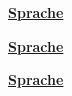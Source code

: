 \documentclass[landscape,slidestop]{slides}
\newcommand{\feedback}[2]{
\pagecolor{bg}

\begin{center}
{\Huge \textbf{\underline{#1}}}
\vspace{2em}
{\small }
\end{center}
}
\begin{document}
\begin{slide}
\feedback{Sprache}{tabular_A1}
\null
\vfill 
\end{slide}
\begin{slide}
\feedback{Sprache}{tabular_A2}
\null
\vfill
\end{slide}
\begin{slide}
\feedback{Sprache}{tabular_A3}
\null
\vfill
\end{slide}
\end{document}
